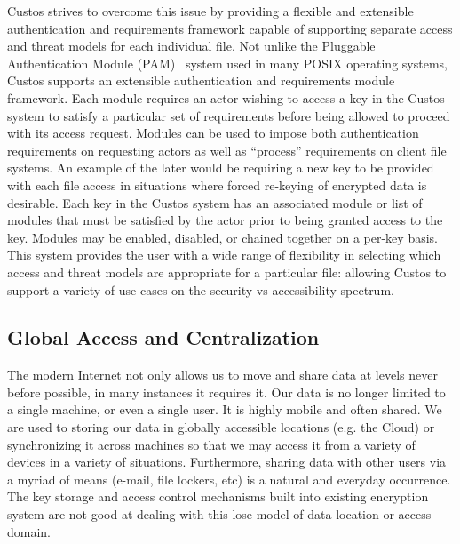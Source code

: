 Custos strives to overcome this issue by providing a flexible and
extensible authentication and requirements framework capable of
supporting separate access and threat models for each individual
file. Not unlike the Pluggable Authentication Module
(PAM)~\cite{linux-pam} system used in many POSIX operating systems,
Custos supports an extensible authentication and requirements module
framework. Each module requires an actor wishing to access a key in
the Custos system to satisfy a particular set of requirements before
being allowed to proceed with its access request. Modules can be used
to impose both authentication requirements on requesting actors as
well as ``process'' requirements on client file systems. An example of
the later would be requiring a new key to be provided with each file
access in situations where forced re-keying of encrypted data is
desirable. Each key in the Custos system has an associated module or
list of modules that must be satisfied by the actor prior to being
granted access to the key. Modules may be enabled, disabled, or
chained together on a per-key basis. This system provides the user
with a wide range of flexibility in selecting which access and threat
models are appropriate for a particular file: allowing Custos to
support a variety of use cases on the security vs accessibility
spectrum.

\subsection{Global Access and Centralization}

The modern Internet not only allows us to move and share data at
levels never before possible, in many instances it requires it. Our
data is no longer limited to a single machine, or even a single
user. It is highly mobile and often shared. We are used to storing our
data in globally accessible locations (e.g. the Cloud) or
synchronizing it across machines so that we may access it from a
variety of devices in a variety of situations. Furthermore, sharing
data with other users via a myriad of means (e-mail, file lockers,
etc) is a natural and everyday occurrence. The key storage and access
control mechanisms built into existing encryption system are not good
at dealing with this lose model of data location or access domain.

